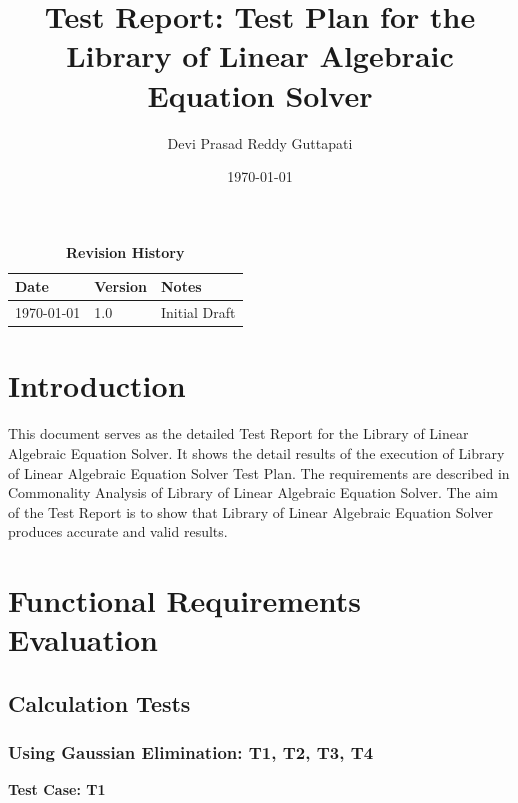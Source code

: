 \documentclass[12pt, titlepage]{article}
\title{Test Report: Test Plan for the Library of Linear Algebraic Equation Solver}
\author{Devi Prasad Reddy Guttapati
}
\date{\today}
\begin{document}
\maketitle




\begin{table}[bp]
\caption{\bf Revision History}
\begin{tabularx}{\textwidth}{p{3cm}p{2cm}X}
\toprule {\bf Date} & {\bf Version} & {\bf Notes}\\
\midrule
\today & 1.0 & Initial Draft\\

\bottomrule
\end{tabularx}
\end{table}



\tableofcontents
\listoftables
\listoffigures

\newpage




\section{Introduction}

This document serves as the detailed Test Report for the Library of Linear Algebraic Equation Solver. It shows the detail results of the execution of Library of Linear Algebraic Equation Solver Test Plan. The requirements are described in Commonality Analysis of Library of Linear Algebraic Equation Solver. The aim of the Test Report is to show that Library of Linear Algebraic Equation Solver produces accurate and valid results.

\section{Functional Requirements Evaluation}\label{sec_fre}
\subsection{Calculation Tests}
\subsubsection{Using Gaussian Elimination: T1, T2, T3, T4}

\textbf{Test Case: T1}\\ 
\end{document}
